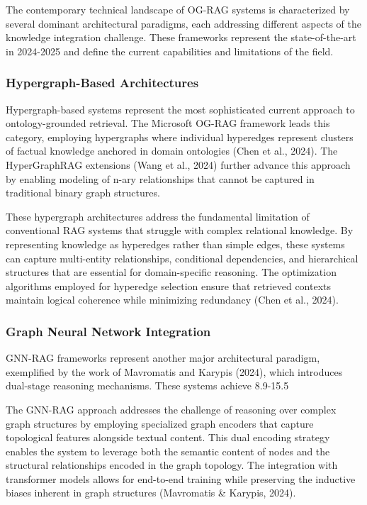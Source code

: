 \documentclass[12pt]{report}
\begin{document}
The contemporary technical landscape of OG-RAG systems is characterized by several dominant architectural paradigms, each addressing different aspects of the knowledge integration challenge. These frameworks represent the state-of-the-art in 2024-2025 and define the current capabilities and limitations of the field.

\subsubsection{Hypergraph-Based Architectures}

Hypergraph-based systems represent the most sophisticated current approach to ontology-grounded retrieval. The Microsoft OG-RAG framework leads this category, employing hypergraphs where individual hyperedges represent clusters of factual knowledge anchored in domain ontologies (Chen et al., 2024). The HyperGraphRAG extensions (Wang et al., 2024) further advance this approach by enabling modeling of n-ary relationships that cannot be captured in traditional binary graph structures.

These hypergraph architectures address the fundamental limitation of conventional RAG systems that struggle with complex relational knowledge. By representing knowledge as hyperedges rather than simple edges, these systems can capture multi-entity relationships, conditional dependencies, and hierarchical structures that are essential for domain-specific reasoning. The optimization algorithms employed for hyperedge selection ensure that retrieved contexts maintain logical coherence while minimizing redundancy (Chen et al., 2024).

\subsubsection{Graph Neural Network Integration}

GNN-RAG frameworks represent another major architectural paradigm, exemplified by the work of Mavromatis and Karypis (2024), which introduces dual-stage reasoning mechanisms. These systems achieve 8.9-15.5%

The GNN-RAG approach addresses the challenge of reasoning over complex graph structures by employing specialized graph encoders that capture topological features alongside textual content. This dual encoding strategy enables the system to leverage both the semantic content of nodes and the structural relationships encoded in the graph topology. The integration with transformer models allows for end-to-end training while preserving the inductive biases inherent in graph structures (Mavromatis \& Karypis, 2024).
\end{document}
